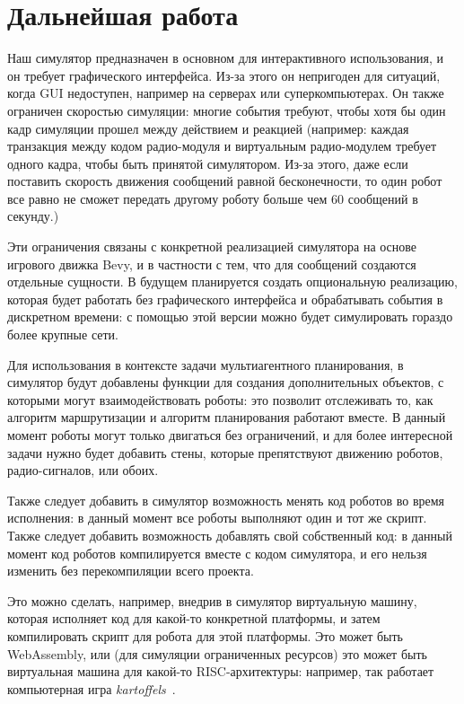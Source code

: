 \documentclass[%
]{report}
\begin{document}
\section{Дальнейшая работа}

Наш симулятор предназначен в основном для интерактивного использования,
и он требует графического интерфейса.
Из-за этого он непригоден для ситуаций, когда GUI недоступен,
например на серверах или суперкомпьютерах.
Он также ограничен скоростью симуляции:
многие события требуют, чтобы хотя бы один кадр симуляции прошел
между действием и реакцией
(например: каждая транзакция между кодом радио-модуля
и виртуальным радио-модулем
требует одного кадра,
чтобы быть принятой симулятором.
Из-за этого,
даже если поставить скорость движения сообщений равной бесконечности,
то один робот все равно не сможет передать другому роботу
больше чем 60 сообщений в секунду.)

Эти ограничения связаны с конкретной реализацией симулятора
на основе игрового движка Bevy,
и в частности с тем, что для сообщений создаются отдельные сущности.
В будущем планируется создать опциональную реализацию,
которая будет работать без графического интерфейса
и обрабатывать события в дискретном времени:
с помощью этой версии можно будет симулировать гораздо более крупные сети.

Для использования в контексте задачи
мультиагентного планирования,
в симулятор будут добавлены
функции для создания дополнительных объектов,
с которыми могут взаимодействовать роботы:
это позволит отслеживать то,
как алгоритм маршрутизации и алгоритм планирования работают вместе.
В данный момент роботы могут только двигаться без ограничений,
и для более интересной задачи нужно будет добавить стены, которые препятствуют движению роботов,
радио-сигналов, или обоих.

Также следует добавить в симулятор
возможность менять код роботов во время исполнения:
в данный момент все роботы выполняют один и тот же скрипт.
Также следует добавить возможность добавлять свой собственный код:
в данный момент код роботов компилируется вместе с кодом симулятора,
и его нельзя изменить без перекомпиляции всего проекта.

Это можно сделать, например,
внедрив в симулятор виртуальную машину,
которая исполняет код для какой-то конкретной платформы,
и затем компилировать скрипт для робота для этой платформы.
Это может быть WebAssembly,
или (для симуляции ограниченных ресурсов)
это может быть виртуальная машина для какой-то RISC-архитектуры:
например, так работает компьютерная игра \emph{kartoffels}~\cite{kartoffels}.
\end{document}
